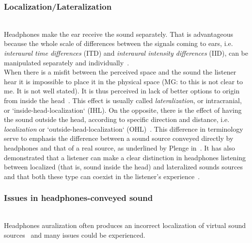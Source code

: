 \documentclass[journal]{IEEEtran}
\begin{document}
\subsubsection*{Localization/Lateralization}~\\
Headphones make the ear receive the sound separately. That is advantageous because the whole scale of differences between the signals coming to ears, i.e. \emph{interaural time differences} (ITD) and \emph{interaural intensity differences} (IID), can be manipulated separately and individually~\cite{plenge1972}.\\
When there is a misfit between the perceived space and the sound the listener hear it is impossible to place it in the physical space (MG: to this is not clear to me. It is not well stated). It is thus perceived in lack of better options to origin from inside the head~\cite{harma2004}. This effect is usually called \emph{lateralization}, or intracranial, or `inside-head-localization` (IHL). On the opposite, there is the effect of having the sound outside the head, according to specific direction and distance, i.e. \emph{localization} or `outside-head-localization` (OHL)~\cite{plenge1972}. This difference in terminology serve to emphasis the difference between a sound source conveyed directly by headphones and that of a real source, as underlined by Plenge in~\cite{plenge1972}. It has also demonstrated that a listener can make a clear distinction in headphones listening between localized (that is, sound inside the head) and lateralized sounds sources and that both these type can coexist in the listener's experience~\cite{plenge1972}.  \\

\subsubsection*{Issues in headphones-conveyed sound}~\\
Headphones auralization often produces an incorrect localization of virtual sound sources~\cite{harma2004} and many issues could be experienced.\\
\end{document}
